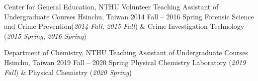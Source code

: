 \begin{cventries}
\cventry
{Center for General Education, NTHU}
{Volunteer Teaching Assistant of Undergraduate Courses}
{Hsinchu, Taiwan}
{2014 Fall -- 2016 Spring}
{Forensic Science and Crime Prevention(\textit{2014 Fall}, \textit{2015 Fall}) \& Crime Investigation Technology (\textit{2015 Spring}, \textit{2016 Spring})}

\cventry
{Department of Chemistry, NTHU}
{Teaching Assistant of Undergraduate Courses}
{Hsinchu, Taiwan}
{2019 Fall -- 2020 Spring}
{Physical Chemistry Laboratory  (\textit{2019 Fall}) \& Physical Chemistry  (\textit{2020 Spring})}
\end{cventries}